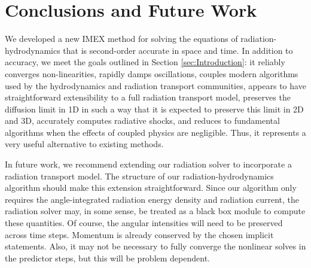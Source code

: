 \documentclass[preprint,12pt]{elsarticle}
\begin{document}
\section{Conclusions and Future Work}
\label{sec:Conclusions}

We developed a new IMEX method for solving the equations of radiation-hydrodynamics that is second-order accurate in space
and time.  In addition to accuracy, we meet the goals outlined in Section \ref{sec:Introduction}: it reliably converges
non-linearities, rapidly damps oscillations, couples modern algorithms used by the hydrodynamics and radiation
transport communities, appears to have straightforward extensibility to a full radiation transport model, preserves the
diffusion limit in 1D in such a way that it is expected to preserve this limit in 2D and 3D, accurately computes
radiative shocks, and reduces to fundamental algorithms when the effects of coupled physics are negligible.  Thus, it
represents a very useful alternative to existing methods.

In future work, we recommend extending our radiation solver to incorporate a radiation transport model.  The structure
of our radiation-hydrodynamics algorithm should make this extension straightforward.  Since our algorithm only requires
the angle-integrated radiation energy density and radiation current, the radiation solver may, in some sense, be treated
as a black box module to compute these quantities.  Of course, the angular intensities will need to be preserved across
time steps. Momentum is already conserved by the chosen implicit statements.  Also, it may not be necessary to fully
converge the nonlinear solves in the predictor steps, but this will be problem dependent.



\clearpage

\appendix
\end{document}

